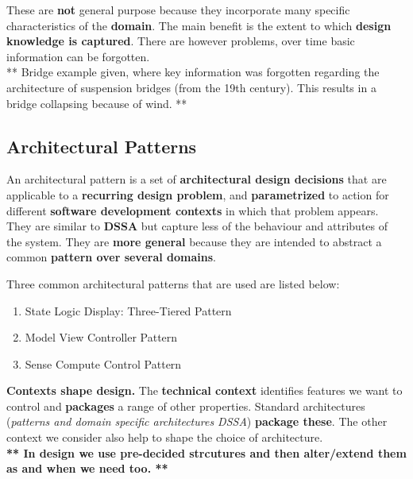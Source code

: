 \documentclass[a4paper]{article}
\begin{document}
These are \textbf{not} general purpose because they incorporate many specific characteristics of the \textbf{domain}. The main benefit is the extent to which \textbf{design knowledge is captured}. There are however problems, over time basic information can be forgotten.\\

** Bridge example given, where key information was forgotten regarding the architecture of suspension bridges (from the 19th century). This results in a bridge collapsing because of wind. **
\subsection{Architectural Patterns}

An architectural pattern is a set of \textbf{architectural design decisions} that are applicable to a \textbf{recurring design problem}, and \textbf{parametrized} to action for different \textbf{software development contexts} in which that problem appears.\\

They are similar to \textbf{DSSA} but capture less of the behaviour and attributes of the system. They are \textbf{more general} because they are intended to abstract a common \textbf{pattern over several domains}.

Three common architectural patterns that are used are listed below:
\begin{enumerate}
\item State Logic Display: Three-Tiered Pattern
\item Model View Controller Pattern
\item Sense Compute Control Pattern\\
\end{enumerate}

\textbf{Contexts shape design.} The \textbf{technical context} identifies features we want to control and \textbf{packages} a range of other properties. Standard architectures (\textit{patterns and domain specific architectures DSSA}) \textbf{package these}. The other context we consider also help to shape the choice of architecture.\\

\textbf{** In design we use pre-decided strcutures and then alter/extend them as and when we need too. **}
\end{document}
